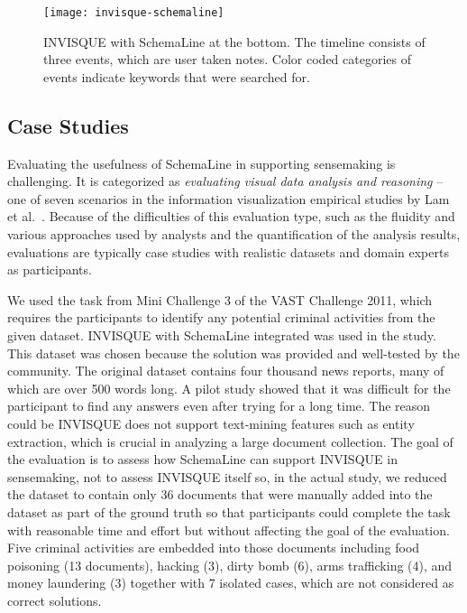 \begin{figure}[!htb]
	\centering
	\texttt{[image: invisque-schemaline]}
	\caption{INVISQUE with SchemaLine at the bottom. The timeline consists of three events, which are user taken notes. Color coded categories of events indicate keywords that were searched for.}
	\label{fig:invisque-schemaline}
\end{figure}

\subsection{Case Studies}
Evaluating the usefulness of SchemaLine in supporting sensemaking is challenging. It is categorized as \textit{evaluating visual data analysis and reasoning} -- one of seven scenarios in the information visualization empirical studies by Lam et al.~\cite{Lam2012}. Because of the difficulties of this evaluation type, such as the fluidity and various approaches used by analysts and the quantification of the analysis results, evaluations are typically case studies with realistic datasets and domain experts as participants.

We used the task from Mini Challenge 3 of the VAST Challenge 2011, which requires the participants to identify any potential criminal activities from the given dataset. INVISQUE with SchemaLine integrated was used in the study. This dataset was chosen because the solution was provided and well-tested by the community. The original dataset contains four thousand news reports, many of which are over 500 words long. A pilot study showed that it was difficult for the participant to find any answers even after trying for a long time. The reason could be INVISQUE does not support text-mining features such as entity extraction, which is crucial in analyzing a large document collection. The goal of the evaluation is to assess how SchemaLine can support INVISQUE in sensemaking, not to assess INVISQUE itself so, in the actual study, we reduced the dataset to contain only 36 documents that were manually added into the dataset as part of the ground truth so that participants could complete the task with reasonable time and effort but without affecting the goal of the evaluation. Five criminal activities are embedded into those documents including food poisoning (13 documents), hacking (3), dirty bomb (6), arms trafficking (4), and money laundering (3) together with 7 isolated cases, which are not considered as correct solutions.

